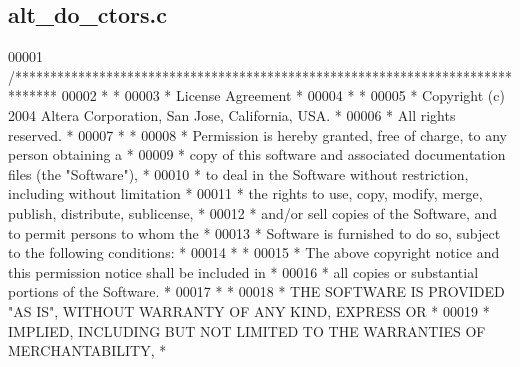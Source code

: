 \subsection{alt\+\_\+do\+\_\+ctors.\+c}
\label{alt__do__ctors_8c_source}

\begin{DoxyCode}
00001 \textcolor{comment}{/******************************************************************************}
00002 \textcolor{comment}{*                                                                             *}
00003 \textcolor{comment}{* License Agreement                                                           *}
00004 \textcolor{comment}{*                                                                             *}
00005 \textcolor{comment}{* Copyright (c) 2004 Altera Corporation, San Jose, California, USA.           *}
00006 \textcolor{comment}{* All rights reserved.                                                        *}
00007 \textcolor{comment}{*                                                                             *}
00008 \textcolor{comment}{* Permission is hereby granted, free of charge, to any person obtaining a     *}
00009 \textcolor{comment}{* copy of this software and associated documentation files (the "Software"),  *}
00010 \textcolor{comment}{* to deal in the Software without restriction, including without limitation   *}
00011 \textcolor{comment}{* the rights to use, copy, modify, merge, publish, distribute, sublicense,    *}
00012 \textcolor{comment}{* and/or sell copies of the Software, and to permit persons to whom the       *}
00013 \textcolor{comment}{* Software is furnished to do so, subject to the following conditions:        *}
00014 \textcolor{comment}{*                                                                             *}
00015 \textcolor{comment}{* The above copyright notice and this permission notice shall be included in  *}
00016 \textcolor{comment}{* all copies or substantial portions of the Software.                         *}
00017 \textcolor{comment}{*                                                                             *}
00018 \textcolor{comment}{* THE SOFTWARE IS PROVIDED "AS IS", WITHOUT WARRANTY OF ANY KIND, EXPRESS OR  *}
00019 \textcolor{comment}{* IMPLIED, INCLUDING BUT NOT LIMITED TO THE WARRANTIES OF MERCHANTABILITY,    *}

\end{DoxyCode}
